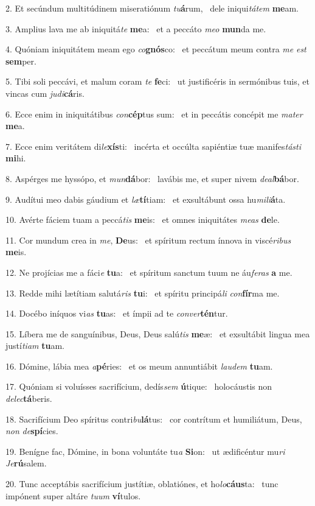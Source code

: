 2. Et secúndum multitúdinem miseratiónum \textit{tu}\textbf{á}rum, \ast\  dele iniqui\textit{tá}\textit{tem} \textbf{me}am.\

3. Amplius lava me ab iniquitá\textit{te} \textbf{me}a: \ast\  et a peccáto \textit{me}\textit{o} \textbf{mun}da me.\

4. Quóniam iniquitátem meam ego \textit{co}\textbf{gnós}co: \ast\  et peccátum meum contra \textit{me} \textit{est} \textbf{sem}per.\

5. Tibi soli peccávi, et malum coram \textit{te} \textbf{fe}ci: \ast\  ut justificéris in sermónibus tuis, et vincas cum \textit{ju}\textit{di}\textbf{cá}ris.\

6. Ecce enim in iniquitátibus \textit{con}\textbf{cép}tus sum: \ast\  et in peccátis concépit me \textit{ma}\textit{ter} \textbf{me}a.\

7. Ecce enim veritátem di\textit{le}\textbf{xís}ti: \ast\  incérta et occúlta sapiéntiæ tuæ manifes\textit{tás}\textit{ti} \textbf{mi}hi.\

8. Aspérges me hyssópo, et \textit{mun}\textbf{dá}bor: \ast\  lavábis me, et super nivem \textit{de}\textit{al}\textbf{bá}bor.\

9. Audítui meo dabis gáudium et \textit{læ}\textbf{tí}tiam: \ast\  et exsultábunt ossa hu\textit{mi}\textit{li}\textbf{á}ta.\

10. Avérte fáciem tuam a peccá\textit{tis} \textbf{me}is: \ast\  et omnes iniquitátes \textit{me}\textit{as} \textbf{de}le.\

11. Cor mundum crea in \textit{me}, \textbf{De}us: \ast\  et spíritum rectum ínnova in viscé\textit{ri}\textit{bus} \textbf{me}is.\

12. Ne projícias me a fáci\textit{e} \textbf{tu}a: \ast\  et spíritum sanctum tuum ne áu\textit{fe}\textit{ras} \textbf{a} me.\

13. Redde mihi lætítiam salutá\textit{ris} \textbf{tu}i: \ast\  et spíritu principá\textit{li} \textit{con}\textbf{fír}ma me.\

14. Docébo iníquos vi\textit{as} \textbf{tu}as: \ast\  et ímpii ad te \textit{con}\textit{ver}\textbf{tén}tur.\

15. Líbera me de sanguínibus, Deus, Deus salú\textit{tis} \textbf{me}æ: \ast\  et exsultábit lingua mea justí\textit{ti}\textit{am} \textbf{tu}am.\

16. Dómine, lábia mea \textit{a}\textbf{pé}ries: \ast\  et os meum annuntiábit \textit{lau}\textit{dem} \textbf{tu}am.\

17. Quóniam si voluísses sacrifícium, dedís\textit{sem} \textbf{ú}tique: \ast\  holocáustis non \textit{de}\textit{lec}\textbf{tá}beris.\

18. Sacrifícium Deo spíritus contri\textit{bu}\textbf{lá}tus: \ast\  cor contrítum et humiliátum, Deus, \textit{non} \textit{de}\textbf{spí}cies.\

19. Benígne fac, Dómine, in bona voluntáte tu\textit{a} \textbf{Si}on: \ast\  ut ædificéntur mu\textit{ri} \textit{Je}\textbf{rú}salem.\

20. Tunc acceptábis sacrifícium justítiæ, oblatiónes, et ho\textit{lo}\textbf{cáus}ta: \ast\  tunc impónent super altáre \textit{tu}\textit{um} \textbf{ví}tulos.\

